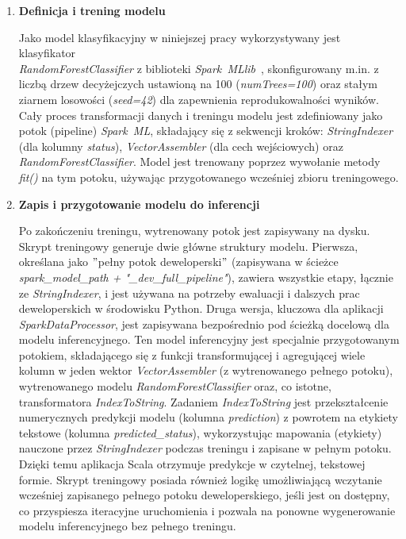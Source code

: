\begin{enumerate}
    \item \textbf{Definicja i trening modelu}

Jako model klasyfikacyjny w niniejszej pracy wykorzystywany jest klasyfikator \\ \textit{RandomForestClassifier} z biblioteki \mbox{\textit{Spark MLlib}}~\cite{spark_mllib_reference}, skonfigurowany m.in. z liczbą drzew decyżejczych ustawioną na 100 (\textit{numTrees=100}) oraz stałym ziarnem losowości (\textit{seed=42}) dla zapewnienia reprodukowalności wyników. Cały proces transformacji danych i treningu modelu jest zdefiniowany jako potok (pipeline) \mbox{\textit{Spark ML}}, składający się z sekwencji kroków: \textit{StringIndexer} (dla kolumny \textit{status}), \textit{VectorAssembler} (dla cech wejściowych) oraz \textit{RandomForestClassifier}. Model jest trenowany poprzez wywołanie metody \textit{fit()} na tym potoku, używając przygotowanego wcześniej zbioru treningowego.

    \item \textbf{Zapis i przygotowanie modelu do inferencji}

Po zakończeniu treningu, wytrenowany potok jest zapisywany na dysku. Skrypt treningowy generuje dwie główne struktury modelu. Pierwsza, określana jako \("\)pełny potok deweloperski\("\) (zapisywana w ścieżce \textit{spark\_model\_path + "\_dev\_full\_pipeline"}), zawiera wszystkie etapy, łącznie ze \textit{StringIndexer}, i jest używana na potrzeby ewaluacji i dalszych prac deweloperskich w środowisku Python. Druga wersja, kluczowa dla aplikacji \textit{SparkDataProcessor}, jest zapisywana bezpośrednio pod ścieżką docelową dla modelu inferencyjnego. Ten model inferencyjny jest specjalnie przygotowanym potokiem, składającego się z funkcji transformującej i agregującej wiele kolumn w jeden wektor \textit{VectorAssembler} (z wytrenowanego pełnego potoku), wytrenowanego modelu \textit{RandomForestClassifier} oraz, co istotne, transformatora \textit{IndexToString}. Zadaniem \textit{IndexToString} jest przekształcenie numerycznych predykcji modelu (kolumna \textit{prediction}) z powrotem na etykiety tekstowe (kolumna \textit{predicted\_status}), wykorzystując mapowania (etykiety) nauczone przez \textit{StringIndexer} podczas treningu i zapisane w pełnym potoku. Dzięki temu aplikacja Scala otrzymuje predykcje w czytelnej, tekstowej formie. Skrypt treningowy posiada również logikę umożliwiającą wczytanie wcześniej zapisanego pełnego potoku deweloperskiego, jeśli jest on dostępny, co przyspiesza iteracyjne uruchomienia i pozwala na ponowne wygenerowanie modelu inferencyjnego bez pełnego treningu.


\end{enumerate}
